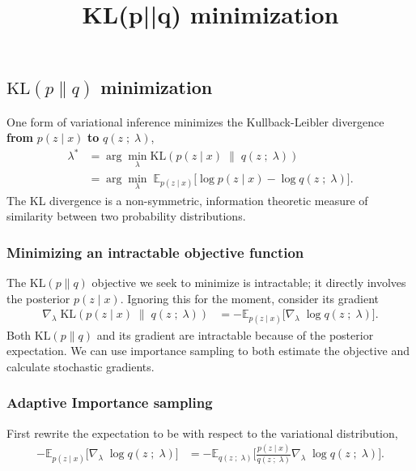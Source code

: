 \title{KL(p||q) minimization}

\subsection{$\text{KL}(p\|q)$ minimization}

One form of variational inference minimizes the Kullback-Leibler divergence
\textbf{from} $p(z \mid x)$ \textbf{to} $q(z\;;\;\lambda)$,
\begin{align*}
  \lambda^*
  &=
  \arg\min_\lambda \text{KL}(
  p(z \mid x)
  \;\|\;
  q(z\;;\;\lambda)
  )\\
  &=
  \arg\min_\lambda\;
  \mathbb{E}_{p(z \mid x)}
  \big[
  \log p(z \mid x)
  -
  \log q(z\;;\;\lambda)
  \big].
\end{align*}
The KL divergence is a non-symmetric, information theoretic measure of
similarity between two probability distributions.

\subsubsection{Minimizing an intractable objective function}

The $\text{KL}(p\|q)$ objective we seek to minimize is intractable; it directly
involves the posterior $p(z \mid x)$. Ignoring this for the moment, consider its
gradient
\begin{align*}
  \nabla_\lambda\;
  \text{KL}(
  p(z \mid x)
  \;\|\;
  q(z\;;\;\lambda)
  )
  &=
  -
  \mathbb{E}_{p(z \mid x)}
  \big[
  \nabla_\lambda\;
  \log q(z\;;\;\lambda)
  \big].
\end{align*}
Both $\text{KL}(p\|q)$ and its gradient are intractable
because of the posterior expectation.
We can use importance sampling to both
estimate the objective and calculate stochastic gradients.

\subsubsection{Adaptive Importance sampling}

First rewrite the expectation to be with respect to the variational
distribution,
\begin{align*}
  -
  \mathbb{E}_{p(z \mid x)}
  \big[
  \nabla_\lambda\;
  \log q(z\;;\;\lambda)
  \big]
  &=
  -
  \mathbb{E}_{q(z\;;\;\lambda)}
  \Bigg[
  \frac{p(z \mid x)}{q(z\;;\;\lambda)}
  \nabla_\lambda\;
  \log q(z\;;\;\lambda)
  \Bigg].
\end{align*}

